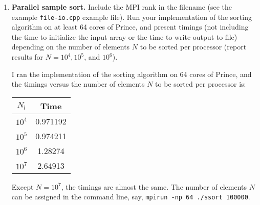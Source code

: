 \documentclass[12pt]{article}
\begin{document}
\begin{enumerate}
\item {\bf Parallel sample sort.}  
 Include the MPI rank in the filename (see the example
 \texttt{file-io.cpp} example file).  Run your implementation of
 the sorting algorithm on at least 64 cores of Prince, and present
 timings (not including the time to initialize the input array or the
 time to write output to file) depending on the number of elements $N$
 to be sorted per processor (report results for $N=10^4, 10^5$, and $10^6$).

I ran the implementation of the sorting algorithm on 64 cores of Prince, and the timings versus the number of elements $N$ to be sorted per processor is:
\begin{center}
\begin{tabular}{ |c|c| } 
 \hline
$N_l$  &  Time \\
 \hline
  $10^4$ & 0.971192 \\
   $10^5$ & 0.974211 \\
  $10^6$ & 1.28274\\
  $10^7$  & 2.64913\\
  \hline
\end{tabular}
\end{center}

Except $N=10^7$, the timings are almost the same. The number of elements $N$ can be assigned in the command line, say, \texttt{mpirun -np 64 ./ssort 100000}.

\end{enumerate}
\end{document}
